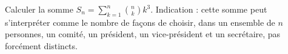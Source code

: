 Calculer la somme $S_n = \sum_{k=1}^n \binom{n}{k}k^3$. Indication : cette somme peut s'interpréter comme le nombre de façons de choisir, dans un ensemble de $n$ personnes, un comité, un président, un vice-président et un secrétaire, pas forcément distincts.
